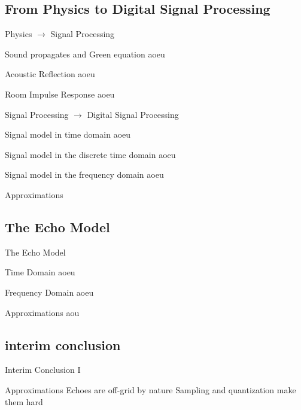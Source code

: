 \subsection{From Physics to Digital Signal Processing}

\begin{frame}{Physics $\longrightarrow$ Signal Processing}

    \begin{block}{Sound propagates and Green equation}
        aoeu
    \end{block}

    \begin{block}{Acoustic Reflection}
        aoeu
    \end{block}

    \begin{block}{Room Impulse Response}
        aoeu
    \end{block}

\end{frame}

\begin{frame}{Signal Processing $\longrightarrow$ \alert{Digital} Signal Processing}
    \begin{block}{Signal model in time domain}
        aoeu
    \end{block}

    \begin{block}{Signal model in the discrete time domain}
        aoeu
    \end{block}

    \begin{block}{Signal model in the frequency domain}
        aoeu
    \end{block}

    \begin{block}{Approximations}

    \end{block}

\end{frame}

\subsection{The Echo Model}
\begin{frame}{The Echo Model}
    \begin{block}{Time Domain}
        aoeu
    \end{block}

    \begin{block}{Frequency Domain}
        aoeu
    \end{block}

    \begin{block}{Approximations}
        aou
    \end{block}

\end{frame}

\subsection*{interim conclusion}
\begin{frame}{Interim Conclusion I}
    \begin{alertblock}{Approximations}
        Echoes are off-grid by nature
        Sampling and quantization make them hard
    \end{alertblock}
\end{frame}
